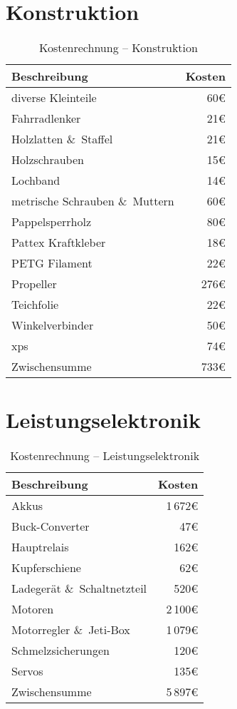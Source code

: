 \section{Konstruktion}
\begin{table}[H]
    \centering
    \begin{tabular}{|l|r|}
        \hline
        \textbf{Beschreibung} & \textbf{Kosten}\\\hline
        diverse Kleinteile & 60\euro\\
        Fahrradlenker & 21\euro\\
        Holzlatten \&\ Staffel & 21\euro\\
        Holzschrauben & 15\euro\\
        Lochband & 14\euro\\
        metrische Schrauben \&\ Muttern & 60\euro\\
        Pappelsperrholz & 80\euro\\
        Pattex Kraftkleber & 18\euro\\
        PETG Filament & 22\euro\\
        Propeller & 276\euro\\
        Teichfolie & 22\euro\\
        Winkelverbinder & 50\euro\\
        \acs{xps} & 74\euro\\        
        \hline
        Zwischensumme & 733\euro\\\hline
    \end{tabular}
    \caption{Kostenrechnung -- Konstruktion}
\end{table}

\section{Leistungselektronik}
\begin{table}[H]
    \centering
    \begin{tabular}{|l|r|}
        \hline
        \textbf{Beschreibung} & \textbf{Kosten}\\\hline
        Akkus & 1\,672\euro\\
        Buck-Converter & 47\euro\\
        Hauptrelais & 162\euro\\
        Kupferschiene & 62\euro\\
        Ladegerät \&\ Schaltnetzteil & 520\euro\\
        Motoren & 2\,100\euro\\
        Motorregler \&\ Jeti-Box & 1\,079\euro\\
        Schmelzsicherungen & 120\euro\\
        Servos & 135\euro\\
        \hline
        Zwischensumme & 5\,897\euro\\\hline
    \end{tabular}
    \caption{Kostenrechnung -- Leistungselektronik}
\end{table}

